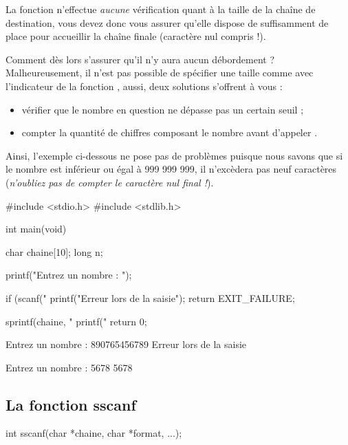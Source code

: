\begin{attentionbox}
 La fonction 
n'effectue \emph{aucune} vérification quant à la taille de la chaîne de
destination, vous devez donc vous assurer qu'elle dispose de
suffisamment de place pour accueillir la chaîne finale (caractère nul
compris !).
\end{attentionbox}


Comment dès lors s'assurer qu'il n'y aura aucun débordement ?
Malheureusement, il n'est pas possible de spécifier une taille comme
avec l'indicateur  de la fonction , aussi,
deux solutions s'offrent à vous :

\begin{itemize}
\item
  vérifier que le nombre en question ne dépasse pas un certain seuil ;
\item
  compter la quantité de chiffres composant le nombre avant d'appeler
  .
\end{itemize}

Ainsi, l'exemple ci-dessous ne pose pas de problèmes puisque nous savons
que si le nombre est inférieur ou égal à 999 999 999, il n'excèdera pas
neuf caractères (\emph{n'oubliez pas de compter le caractère nul final !}).

\begin{C}
#include <stdio.h>
#include <stdlib.h>


int main(void)
{
    char chaine[10];
    long n;

    printf("Entrez un nombre : ");

    if (scanf("%
    {
        printf("Erreur lors de la saisie\n");
        return EXIT_FAILURE;
    }

    sprintf(chaine, "%
    printf("%
    return 0;
}
\end{C}

\begin{C}
Entrez un nombre : 890765456789
Erreur lors de la saisie

Entrez un nombre : 5678
5678
\end{C}

\subsection{La fonction sscanf}
\label{la-fonction-sscanf}

\begin{C}
int sscanf(char *chaine, char *format, ...);
\end{C}

